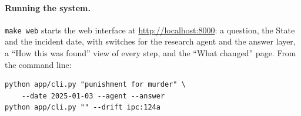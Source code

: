 \documentclass[sigconf,nonacm]{acmart}
\begin{document}
\paragraph{Running the system.} \texttt{make web} starts the web interface at
\url{http://localhost:8000}: a question, the State and the incident date, with switches for the
research agent and the answer layer, a ``How this was found'' view of every step, and the ``What
changed'' page. From the command line:
{\small
\begin{verbatim}
python app/cli.py "punishment for murder" \
    --date 2025-01-03 --agent --answer
python app/cli.py "" --drift ipc:124a
\end{verbatim}
}
\end{document}
